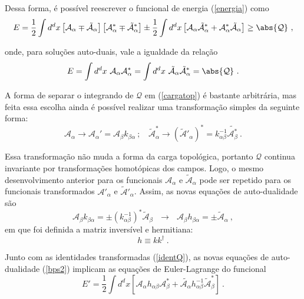 Dessa forma, é possível reescrever o funcional de energia (\ref{energia}) como
\begin{equation}
    E = \dfrac{1}{2} \int d^dx \left[ \mathcal{A}_\alpha \mp \tilde{\mathcal{A}}_\alpha \right] \left[\mathcal{A}^*_\alpha \mp \tilde{\mathcal{A}}_\alpha^* \right] \pm \dfrac{1}{2} \int d^dx \left[\mathcal{A}_\alpha \tilde{\mathcal{A}}_\alpha^* + \mathcal{A}^*_\alpha \tilde{\mathcal{A}}_\alpha\right] \geq \abs{\mathcal{Q}} \ ,
\end{equation}

onde, para soluções auto-duais, vale a igualdade da relação
\begin{equation}
    E = \int d^dx \ \mathcal{A}_\alpha\mathcal{A}^*_\alpha = \int d^dx \ \tilde{\mathcal{A}}_\alpha\tilde{\mathcal{A}}_\alpha^* = \abs{\mathcal{Q}} \ .
\end{equation}

A forma de separar o integrando de $\mathcal{Q}$ em (\ref{cargatop}) é bastante arbitrária, mas feita essa escolha ainda é possível realizar uma transformação simples da seguinte forma:
\begin{equation}
    \mathcal{A}_\alpha \rightarrow \mathcal{A}_\alpha' = \mathcal{A}_\beta k_{\beta\alpha} \ ; \ \ \ \ \tilde{\mathcal{A}}^*_\alpha \rightarrow (\tilde{\mathcal{A}}'_\alpha)^* = k^{-1}_{\alpha\beta} \tilde{\mathcal{A}_\beta^*} \ .
    \label{trasnf_geral}
\end{equation}

Essa transformação não muda a forma da carga topológica, portanto $\mathcal{Q}$ continua invariante por transformações homotópicas dos campos. Logo, o mesmo desenvolvimento anterior para os funcionais $\mathcal{A}_\alpha$ e $\tilde{\mathcal{A}}_\alpha$ pode ser repetido para os funcionais transformados $\mathcal{A}'_\alpha$ e $\tilde{\mathcal{A}}'_\alpha$. Assim, as novas equações de auto-dualidade são
\begin{equation}
    \mathcal{A}_\beta k_{\beta\alpha} = \pm (k^{-1}_{\alpha\beta})^*\tilde{\mathcal{A}}_\beta \ \ \ \rightarrow \ \ \ \mathcal{A}_\beta h_{\beta\alpha} = \pm \tilde{\mathcal{A}}_\alpha \ ,
    \label{bps2}
\end{equation}
em que foi definida a matriz inversível e hermitiana:
\begin{equation}
    h \equiv kk^{\dag} \ .
\end{equation}

Junto com as identidades transformadas (\ref{identQ}), as novas equações de auto-dualidade (\ref{bps2}) implicam as equações de Euler-Lagrange do funcional
\begin{equation}
    E' = \dfrac{1}{2} \int d^dx \left[\mathcal{A}_\alpha h_{\alpha\beta} \mathcal{A}^*_\beta + \tilde{\mathcal{A}_\alpha}h^{-1}_{\alpha\beta} \tilde{\mathcal{A}}^*_\beta\right]
    \label{energia2} \ .
\end{equation}

